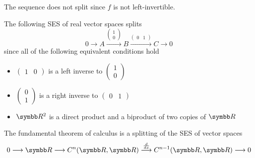 \begin{Example}
\begin{DefEnum}
    The sequence does not split since \( f \) is not left-invertible.

     The following SES of real vector spaces splits
    \begin{equation*}
      0
      \longrightarrow
      A
      \overset {\left(\begin{smallmatrix}1 \\ 0\end{smallmatrix}\right)} \longrightarrow
      B
      \overset {\left(\begin{smallmatrix}0 & 1\end{smallmatrix}\right)} \longrightarrow
      C
      \longrightarrow
      0
    \end{equation*}
    since all of the following equivalent conditions hold
    \begin{itemize}
      \item \( \left(\begin{smallmatrix}1 & 0\end{smallmatrix}\right) \) is a left inverse to \( \left(\begin{smallmatrix}1 \\ 0\end{smallmatrix}\right) \)
      \item \( \left(\begin{smallmatrix}0 \\ 1\end{smallmatrix}\right) \) is a right inverse to \( \left(\begin{smallmatrix}0 & 1\end{smallmatrix}\right) \)
      \item \( \BR^2 \) is a direct product and a biproduct of two copies of \( \BR \)
    \end{itemize}

     The fundamental theorem of calculus is a splitting of the SES of vector spaces
    \begin{equation*}
      0
      \longrightarrow
      \BR
      \longrightarrow
      C^n(\BR, \BR)
      \overset {\frac d {dx}} \longrightarrow
      C^{n-1}(\BR, \BR)
      \longrightarrow
      0
    \end{equation*}
  \end{DefEnum}
\end{Example}

